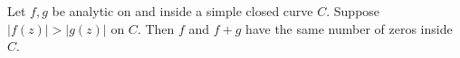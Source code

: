 \documentclass[12pt]{article}
\begin{document}
Let $f,g$ be analytic on and inside a simple closed curve $C$. Suppose $|f(z)|>|g(z)|$ on $C$. Then $f$ and $f+g$ have the same number of zeros inside $C$.
\end{document}
